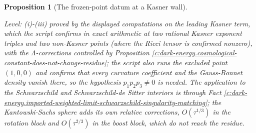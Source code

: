 \documentclass[11pt]{article}
\newtheorem{proposition}[theorem]{Proposition}
\theoremstyle{definition}
\theoremstyle{plain}
\begin{document}
\begin{proposition}[The frozen-point datum at a Kasner wall]
\begin{enumerate}
\end{enumerate}
\emph{Level:} (i)-(iii) proved by the displayed computations on the leading Kasner term, which the script confirms in exact arithmetic at two rational Kasner exponent triples and two non-Kasner points (where the Ricci tensor is confirmed nonzero), with the $\Lambda$-corrections controlled by Proposition \ref{c:dark-energy.cosmological-constant-does-not-change-residue}; the script also runs the excluded point $(1,0,0)$ and confirms that every curvature coefficient and the Gauss-Bonnet density vanish there, so the hypothesis $p_1p_2p_3 \neq 0$ is needed. The application to the Schwarzschild and Schwarzschild-de Sitter interiors is through Fact \ref{c:dark-energy.imported-weighted-limit-schwarzschild-singularity-matching}; the Kantowski-Sachs sphere adds its own relative corrections, $O(\tau^{1/3})$ in the rotation block and $O(\tau^{2/3})$ in the boost block, which do not reach the residue.
\end{proposition}
\end{document}
